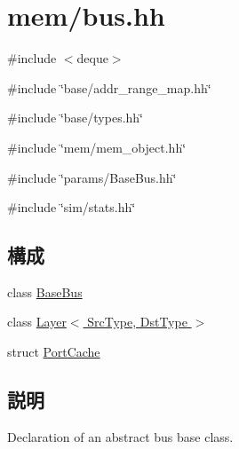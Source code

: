 \hypertarget{bus_8hh}{
\section{mem/bus.hh}
\label{bus_8hh}
}
{\ttfamily \#include $<$deque$>$}\par
{\ttfamily \#include \char`\"{}base/addr\_\-range\_\-map.hh\char`\"{}}\par
{\ttfamily \#include \char`\"{}base/types.hh\char`\"{}}\par
{\ttfamily \#include \char`\"{}mem/mem\_\-object.hh\char`\"{}}\par
{\ttfamily \#include \char`\"{}params/BaseBus.hh\char`\"{}}\par
{\ttfamily \#include \char`\"{}sim/stats.hh\char`\"{}}\par
\subsection*{構成}
\begin{DoxyCompactItemize}
\item 
class \hyperlink{classBaseBus}{BaseBus}
\item 
class \hyperlink{classBaseBus_1_1Layer}{Layer$<$ SrcType, DstType $>$}
\item 
struct \hyperlink{structBaseBus_1_1PortCache}{PortCache}
\end{DoxyCompactItemize}


\subsection{説明}
Declaration of an abstract bus base class. 